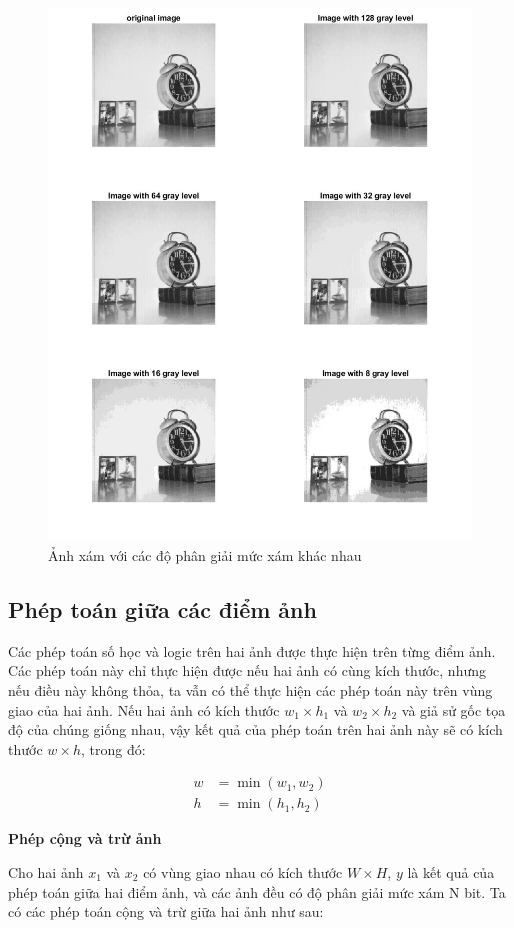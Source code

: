 \begin{figure}[H]
    \centering
    \includegraphics[width=.75\linewidth]{../images/gray_scale_resolution.jpg}
    \caption{Ảnh xám với các độ phân giải mức xám khác nhau}
    \label{fig:gray_scale_resolution}
\end{figure}

\subsection{Phép toán giữa các điểm ảnh}

Các phép toán số học và logic trên hai ảnh được thực hiện trên từng điểm ảnh.
Các phép toán này chỉ thực hiện được nếu hai ảnh có cùng kích thước, nhưng nếu điều này không thỏa, ta vẫn có thể thực hiện các phép toán này trên vùng giao của hai ảnh. Nếu hai ảnh có kích thước $w_1 \times h_1$ và $w_2 \times h_2$ và giả sử gốc tọa độ của chúng giống nhau, vậy kết quả của phép toán trên hai ảnh này sẽ có kích thước $w \times h$, trong đó:

\begin{align}
    w &= \min (w_1, w_2) \\
    h &= \min (h_1, h_2)
\end{align}

\textbf{Phép cộng và trừ ảnh}

Cho hai ảnh $x_1$ và $x_2$ có vùng giao nhau có kích thước $W \times H$, $y$ là kết quả của phép toán giữa hai điểm ảnh, và các ảnh đều có độ phân giải mức xám N bit. Ta có các phép toán cộng và trừ giữa hai ảnh như sau:

